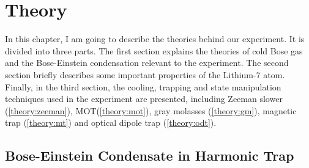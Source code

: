 \chapter{Theory}

In this chapter, I am going to describe the theories behind our experiment. It is divided into three parts. The first section explains the theories of cold Bose gas and the Bose-Einstein condensation relevant to the experiment. The second section briefly describes some important properties of the Lithium-$7$ atom. Finally, in the third section, the cooling, trapping and state manipulation techniques used in the experiment are presented, including Zeeman slower (\ref{theory:zeeman}), MOT(\ref{theory:mot}), gray molasses (\ref{theory:gm}), magnetic trap (\ref{theory:mt}) and optical dipole trap (\ref{theory:odt}).

\section{Bose-Einstein Condensate in Harmonic Trap}\label{theory:bec}

